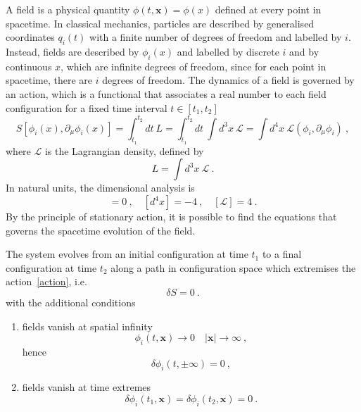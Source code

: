     A field is a physical quantity $\phi(t, \mathbf x) = \phi(x)$ defined at every point in spacetime. In classical mechanics, particles are described by generalised coordinates $q_i(t)$ with a finite number of degrees of freedom and labelled by $i$. Instead, fields are described by $\phi_i (x)$ and labelled by discrete $i$ and by continuous $x$, which are infinite degrees of freedom, since for each point in spacetime, there are $i$ degrees of freedom. The dynamics of a field is governed by an action, which is a functional that associates a real number to each field configuration for a fixed time interval $t \in [t_1, t_2]$
    \begin{equation}\label{action}
        S[\phi_i(x), \partial_\mu \phi_i(x)] = \int_{t_1}^{t_2} dt ~ L = \int_{t_1}^{t_2} dt ~ \int d^3x ~ \mathcal L = \int d^4 x ~ \mathcal L (\phi_i, \partial_\mu \phi_i) ~,
    \end{equation}
    where $\mathcal L$ is the Lagrangian density, defined by 
    \begin{equation*}
        L = \int d^3x ~ \mathcal L ~.
    \end{equation*}
    In natural units, the dimensional analysis is 
    \begin{equation*}
        [S] = 0 ~, \quad  [d^4 x]=-4 ~, \quad  [\mathcal L] = 4 ~.
    \end{equation*}
    By the principle of stationary action, it is possible to find the equations that governs the spacetime evolution of the field. 
    \begin{princ}
        The system evolves from an initial configuration at time $t_1$ to a final configuration at time $t_2$ along a path in configuration space which extremises the action~\eqref{action}, i.e.
        \begin{equation}\label{statact}
            \delta S = 0 ~.
        \end{equation}
        with the additional conditions 
        \begin{enumerate}
            \item fields vanish at spatial infinity
                \begin{equation*}
                    \phi_i(t, \mathbf x) \rightarrow 0 \quad |\mathbf x| \rightarrow \infty ~,
                \end{equation*}
                hence
                \begin{equation}\label{space}
                    \delta \phi_i (t, \pm \infty) = 0 ~,
                \end{equation}
            \item fields vanish at time extremes
                \begin{equation}\label{time}
                    \delta \phi_i (t_1, \mathbf x) = \delta \phi_i (t_2, \mathbf x) = 0 ~.
                \end{equation}
        \end{enumerate}
    \end{princ}
